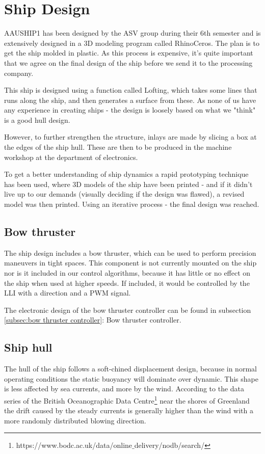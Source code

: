 \chapter{Ship Design}
AAUSHIP1 has been designed by the ASV group during their 6th semester and is extensively designed in a 3D modeling program called RhinoCeros. The plan is to get the ship molded in plastic. As this process is expensive, it's quite important that we agree on the final design of the ship before we send it to the processing company. 

This ship is designed using a function called Lofting, which takes some lines that runs along the ship, and then generates a surface from these. As none of us have any experience in creating ships - the design is loosely based on what we "think" is a good hull design. 

However, to further strengthen the structure, inlays are made by slicing a box at the edges of the ship hull. These are then to be produced in the machine workshop at the department of electronics. 

To get a better understanding of ship dynamics a rapid prototyping technique has been used, where 3D models of the ship have been printed - and if it didn't live up to our demands (visually deciding if the design was flawed), a revised model was then printed. Using an iterative process - the final design was reached.

\section{Bow thruster}
The ship design includes a bow thruster, which can be used to perform precision maneuvers in tight spaces. This component is not currently mounted on the ship nor is it included in our control algorithms, because it has little or no effect on the ship when used at higher speeds. If included, it would be controlled by the \ac{LLI} with a direction and a \ac{PWM} signal. 

The electronic design of the bow thruster controller can be found in subsection \ref{subsec:bow thruster controller}: Bow thruster controller.

\section{Ship hull}

The hull of the ship follows a soft-chined displacement design, because in normal operating conditions the static buoyancy will dominate over dynamic. This shape is less affected by sea currents, and more by the wind. According to the data series of the British Oceanographic Data Centre\footnote[1]{https://www.bodc.ac.uk/data/online$\_$delivery/nodb/search/} near the shores of Greenland the drift caused by the steady currents is generally higher than the wind with a more randomly distributed blowing direction.

